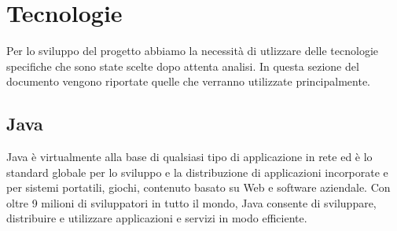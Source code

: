 \section{Tecnologie} 
\label{tecnologie}
Per lo sviluppo del progetto abbiamo la necessità di utlizzare delle tecnologie specifiche che sono state scelte dopo attenta analisi. 
In questa sezione del documento vengono riportate quelle che verranno utilizzate principalmente. 

\subsection{Java}
	
	Java è virtualmente alla base di qualsiasi tipo di applicazione in rete ed è lo standard globale per lo sviluppo e la distribuzione di applicazioni incorporate e per sistemi portatili, giochi, contenuto basato su Web e software aziendale. Con oltre 9 milioni di sviluppatori in tutto il mondo, Java consente di sviluppare, distribuire e utilizzare applicazioni e servizi in modo efficiente. \\
	
